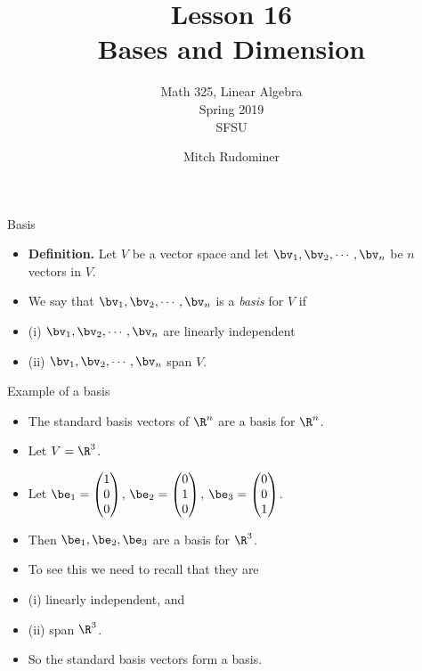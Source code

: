 \documentclass{beamer}
\title{Lesson 16 \\ Bases and Dimension}
\subtitle{Math 325, Linear Algebra \\ Spring 2019 \\ SFSU}
\author{Mitch Rudominer}
\date{}
\begin{document}
\begin{frame}
  \titlepage
\end{frame}


\begin{frame}{Basis}

\begin{itemize}
\item \textbf{Definition.} Let $V$ be a vector space and let $\bv_1,\bv_2,\cdots,\bv_n$ be $n$ vectors in $V$.
\item We say that $\bv_1,\bv_2,\cdots,\bv_n$ is a \emph{basis} for $V$ if
\item (i) $\bv_1,\bv_2,\cdots,\bv_n$ are linearly independent
\item (ii) $\bv_1,\bv_2,\cdots,\bv_n$ span $V$.
\end{itemize}
\end{frame}

\begin{frame}{Example of a basis}

\begin{itemize}
\item The standard basis vectors of $\R^n$ are a basis for $\R^n$.
\item Let $V = \R^3$.
\item Let $\be_1 =
\begin{pmatrix}
1 \\ 0 \\ 0
\end{pmatrix}
$,
$\be_2 =
\begin{pmatrix}
0 \\ 1 \\ 0
\end{pmatrix}
$,
$\be_3=
\begin{pmatrix}
0 \\ 0 \\ 1
\end{pmatrix}
$.

\item Then $\be_1,\be_2,\be_3$ are a basis for $\R^3$.
\item To see this we need to recall that they are
\item (i) linearly independent, and
\item (ii) span $\R^3$.
\item So the standard basis vectors form a basis.
\end{itemize}

\end{frame}
\end{document}
